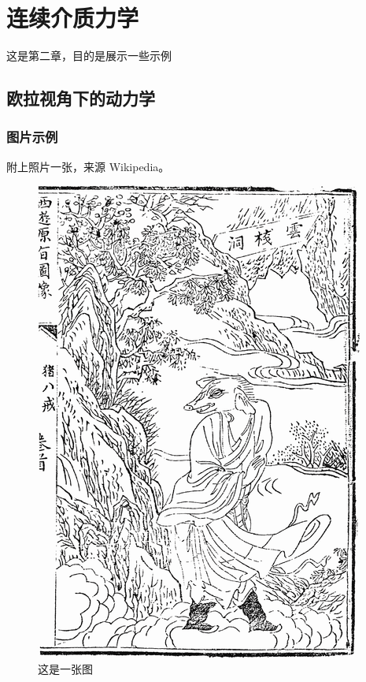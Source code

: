 
\chapter{连续介质力学}\label{chap2}

这是第二章，目的是展示一些示例

\section{欧拉视角下的动力学}

\subsection{图片示例}

附上照片一张，来源 Wikipedia。

\begin{figure}[htbp]
  \centering
  \includegraphics[scale=0.5]{./images/zhubajie.png}
  \caption{这是一张图}
  \label{fig:example}
\end{figure}

